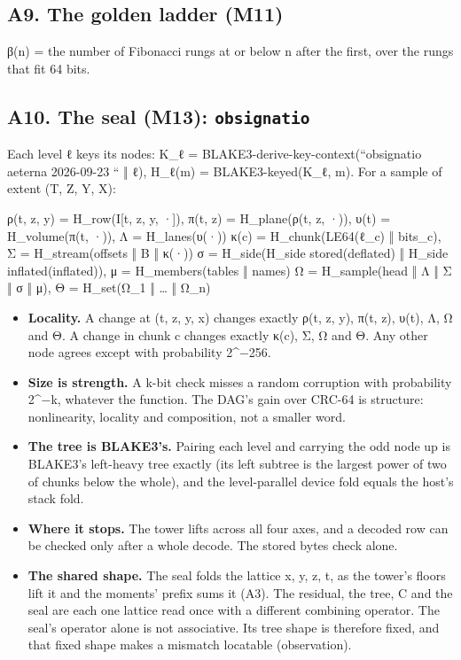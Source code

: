 \subsection{\texorpdfstring{A9. The golden ladder (M11)}{A9. The golden ladder (M11)}}

β(n) = the number of Fibonacci rungs at or below n after the first, over the rungs that fit 64 bits.

\subsection{\texorpdfstring{A10. The seal (M13): \texttt{obsignatio}}{A10. The seal (M13): obsignatio}}

Each level ℓ keys its nodes: K\_\allowbreak{}ℓ = BLAKE3-derive-key-context(“obsignatio aeterna 2026-09-23 “ ‖ ℓ), H\_\allowbreak{}ℓ(m) = BLAKE3-keyed(K\_\allowbreak{}ℓ, m). For a sample of extent (T, Z, Y, X):

ρ(t, z, y) = H\_\allowbreak{}row(I[t, z, y, ·]),  π(t, z) = H\_\allowbreak{}plane(ρ(t, z, ·)),  υ(t) = H\_\allowbreak{}volume(π(t, ·)),  Λ = H\_\allowbreak{}lanes(υ(·)) κ(c) = H\_\allowbreak{}chunk(LE64(ℓ\_\allowbreak{}c) ‖ bits\_\allowbreak{}c),  Σ = H\_\allowbreak{}stream(offsets ‖ B ‖ κ(·)) σ = H\_\allowbreak{}side(H\_\allowbreak{}side stored(deflated) ‖ H\_\allowbreak{}side inflated(inflated)),  μ = H\_\allowbreak{}members(tables ‖ names) Ω = H\_\allowbreak{}sample(head ‖ Λ ‖ Σ ‖ σ ‖ μ),  Θ = H\_\allowbreak{}set(Ω\_\allowbreak{}1 ‖ … ‖ Ω\_\allowbreak{}n)

\begin{itemize}
\item \textbf{Locality.} A change at (t, z, y, x) changes exactly ρ(t, z, y), π(t, z), υ(t), Λ, Ω and Θ. A change in chunk c changes exactly κ(c), Σ, Ω and Θ. Any other node agrees except with probability 2\textasciicircum{}−256.
\item \textbf{Size is strength.} A k-bit check misses a random corruption with probability 2\textasciicircum{}−k, whatever the function. The DAG's gain over CRC-64 is structure: nonlinearity, locality and composition, not a smaller word.
\item \textbf{The tree is BLAKE3's.} Pairing each level and carrying the odd node up is BLAKE3's left-heavy tree exactly (its left subtree is the largest power of two of chunks below the whole), and the level-parallel device fold equals the host's stack fold.
\item \textbf{Where it stops.} The tower lifts across all four axes, and a decoded row can be checked only after a whole decode. The stored bytes check alone.
\item \textbf{The shared shape.} The seal folds the lattice x, y, z, t, as the tower's floors lift it and the moments' prefix sums it (A3). The residual, the tree, C and the seal are each one lattice read once with a different combining operator. The seal's operator alone is not associative. Its tree shape is therefore fixed, and that fixed shape makes a mismatch locatable (observation).
\end{itemize}

